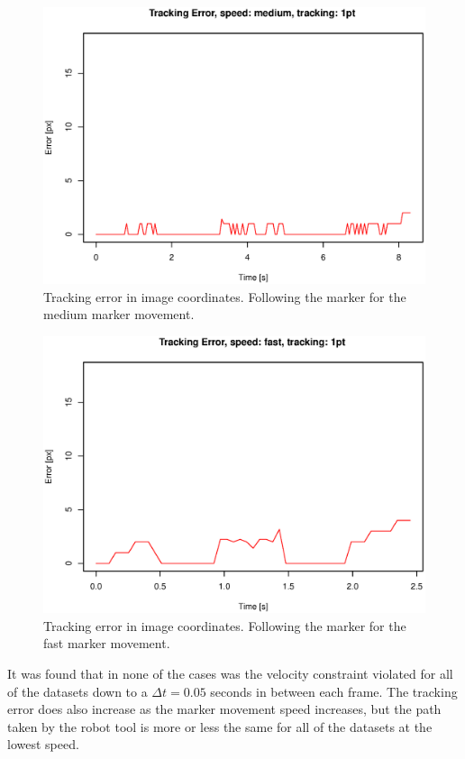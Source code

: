 \begin{figure}[H]
\centering
\includegraphics[width= \fullImageWidth]{graphics/robotics/trackingError_medium_1pt}
\caption{Tracking error in image coordinates.
Following the marker for the medium marker movement.}
\label{fig:trackingerror_medium_1p}
\end{figure}


\begin{figure}[H]
\centering
\includegraphics[width= \fullImageWidth]{graphics/robotics/trackingError_fast_1pt}
\caption{Tracking error in image coordinates.
Following the marker for the fast marker movement.}
\label{fig:trackingerror_fast_1p}
\end{figure}



It was found that in none of the cases was the velocity constraint violated for all of the datasets down to a $\Delta t = 0.05$ seconds in between each frame.
The tracking error does also increase as the marker movement speed increases, but the path taken by the robot tool is more or less the same for all of the datasets at the lowest speed.


